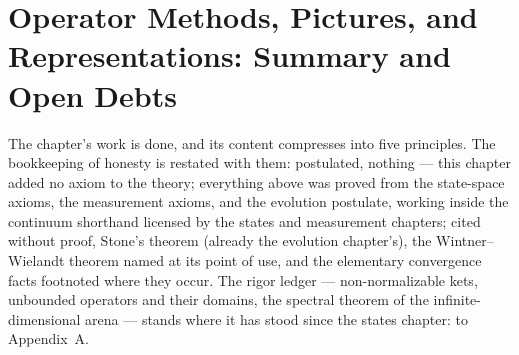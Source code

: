 \section{Operator Methods, Pictures, and Representations: Summary and Open Debts}
\label{sec:ch5summary}

The chapter's work is done, and its content compresses into five principles. The bookkeeping of honesty is restated with them: postulated, nothing --- this chapter added no axiom to the theory; everything above was proved from the state-space axioms, the measurement axioms, and the evolution postulate, working inside the continuum shorthand licensed by the states and measurement chapters; cited without proof, Stone's theorem (already the evolution chapter's), the Wintner--Wielandt theorem named at its point of use, and the elementary convergence facts footnoted where they occur. The rigor ledger --- non-normalizable kets, unbounded operators and their domains, the spectral theorem of the infinite-dimensional arena --- stands where it has stood since the states chapter: to Appendix~A.

